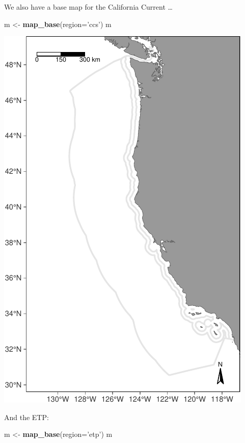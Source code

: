 \documentclass[
]{book}
\newenvironment{Shaded}{\begin{snugshade}}{\end{snugshade}}
\newcommand{\DataTypeTok}[1]{\textcolor[rgb]{0.13,0.29,0.53}{#1}}
\newcommand{\KeywordTok}[1]{\textcolor[rgb]{0.13,0.29,0.53}{\textbf{#1}}}
\newcommand{\NormalTok}[1]{#1}
\newcommand{\StringTok}[1]{\textcolor[rgb]{0.31,0.60,0.02}{#1}}
\begin{document}
We also have a base map for the California Current \ldots{}

\begin{Shaded}
\begin{Highlighting}[]
\NormalTok{m <-}\StringTok{ }\KeywordTok{map_base}\NormalTok{(}\DataTypeTok{region=}\StringTok{'ccs'}\NormalTok{)}
\NormalTok{m}
\end{Highlighting}
\end{Shaded}

\includegraphics{figures/unnamed-chunk-55-1.pdf}

And the ETP:

\begin{Shaded}
\begin{Highlighting}[]
\NormalTok{m <-}\StringTok{ }\KeywordTok{map_base}\NormalTok{(}\DataTypeTok{region=}\StringTok{'etp'}\NormalTok{)}
\NormalTok{m}
\end{Highlighting}
\end{Shaded}
\end{document}
